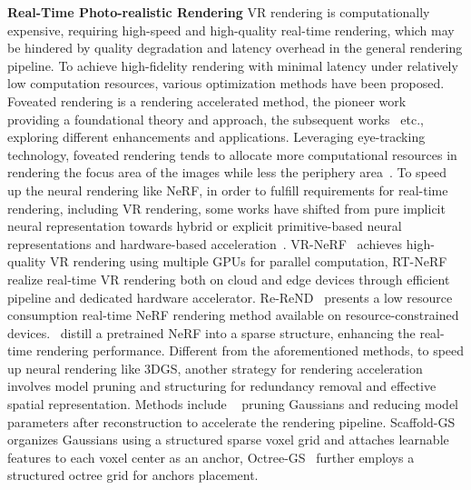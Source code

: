 \textbf{Real-Time Photo-realistic Rendering} VR rendering is computationally expensive, requiring high-speed and high-quality real-time rendering, which may be hindered by quality degradation and latency overhead in the general rendering pipeline\cite{song2023nerfplayer}. To achieve high-fidelity rendering with minimal latency under relatively low computation resources, various optimization methods have been proposed. Foveated rendering is a rendering accelerated method, the pioneer work~\cite{guenter2012foveated} providing a foundational theory and approach, the subsequent works~\cite{krajancich2021perceptual,mantiuk2021fovvideovdp,tursun2019luminance} etc., exploring different enhancements and applications. Leveraging eye-tracking technology, foveated rendering tends to allocate more computational resources in rendering the focus area of the images while less the periphery area~\cite{wang2023foveated}. 
To speed up the neural rendering like NeRF, in order to fulfill requirements for real-time rendering, including VR rendering, some works have shifted from pure implicit neural representation towards hybrid or explicit primitive-based neural representations and hardware-based acceleration~\cite{chen2023mobilenerf,tang2023delicate,hedman2021baking}. VR-NeRF~\cite{xu2023vr} achieves high-quality VR rendering using multiple GPUs for parallel computation, RT-NeRF~\cite{li2022rt} realize real-time VR rendering both on cloud and edge devices through efficient pipeline and dedicated hardware accelerator. Re-ReND~\cite{rojas2023re} presents a low resource consumption real-time NeRF rendering method available on resource-constrained devices.~\cite{yu2021plenoctrees, reiser2023merf, yariv2023bakedsdf} distill a pretrained NeRF into a sparse structure, enhancing the real-time rendering performance. 
Different from the aforementioned methods, to speed up neural rendering like 3DGS, another strategy for rendering acceleration involves model pruning and structuring for redundancy removal and effective spatial representation. Methods include ~\cite{fan2023lightGaussian, lee2024compact, lin2024rtgs} pruning Gaussians and reducing model parameters after reconstruction to accelerate the rendering pipeline. Scaffold-GS~\cite{lu2024scaffold} organizes Gaussians using a structured sparse voxel grid and attaches learnable features to each voxel center as an anchor, Octree-GS~\cite{ren2024octree} further employs a structured octree grid for anchors placement. 

